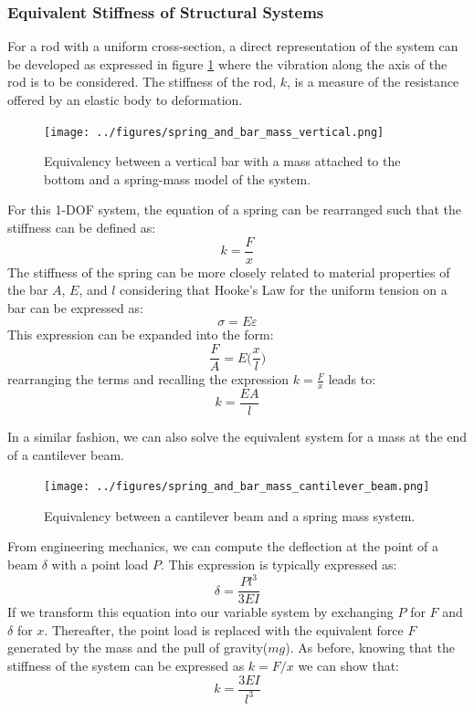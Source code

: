 \documentclass[12pt,letter]{article}
\begin{document}
		\subsubsection{Equivalent Stiffness of Structural Systems}	
		
            For a rod with a uniform cross-section, a direct representation of the system can be developed as expressed in figure \ref{fig:spring_and_bar_mass_vertical} where the vibration along the axis of the rod is to be considered. The stiffness of the rod, $k$, is a measure of the resistance offered by an elastic body to deformation. 

			
			\begin{figure}[H]
				\centering
				\texttt{[image: ../figures/spring\_and\_bar\_mass\_vertical.png]}
				\caption{Equivalency between a vertical bar with a mass attached to the bottom and a spring-mass model of the system.}
				\label{fig:spring_and_bar_mass_vertical}
			\end{figure}
			
			For this 1-DOF system, the equation of a spring can be rearranged such that the stiffness can be defined as:
			\begin{equation}
				k=\frac{F}{x}
			\end{equation}
			The stiffness of the spring can be more closely related to material properties of the bar $A$, $E$, and $l$ considering that Hooke's Law for the uniform tension on a bar can be expressed as:
			\begin{equation}
				\sigma = E \varepsilon
			\end{equation}			
			This expression can be expanded into the form:
			\begin{equation}
				\frac{F}{A} = E \Big( \frac{x}{l} \Big)
			\end{equation}					
			rearranging the terms and recalling the expression $k = \frac{F}{x}$ leads to:			
			\begin{equation}
				 k = \frac{EA}{l}
			\end{equation}				
		
			In a similar fashion, we can also solve the equivalent system for a mass at the end of a cantilever beam.
			\begin{figure}[H]
				\centering
				\texttt{[image: ../figures/spring\_and\_bar\_mass\_cantilever\_beam.png]}
				\caption{Equivalency between a cantilever beam and a spring mass system.}
			\end{figure}			
			From engineering mechanics, we can compute the deflection at the point of a beam $\delta$ with a point load $P$. This expression is typically expressed as:
			\begin{equation}
				\delta = \frac{Pl^3}{3EI}
			\end{equation}					
			If we transform this equation into our variable system by exchanging $P$ for $F$ and $\delta$ for $x$. Thereafter, the point load is replaced with the equivalent force $F$ generated by the mass and the pull of gravity($mg$). As before, knowing that the stiffness of the system can be expressed as $k=F/x$ we can show that:
			\begin{equation}
				k = \frac{3EI}{l^3}
			\end{equation}	
\end{document}
